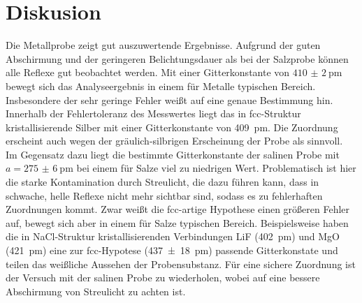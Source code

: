 \section{Diskusion}
Die Metallprobe zeigt gut auszuwertende Ergebnisse. Aufgrund der guten Abschirmung
und der geringeren Belichtungsdauer als bei der Salzprobe können alle Reflexe gut
beobachtet werden. Mit einer Gitterkonstante von $\SI{410(2)}{\pico\metre}$
bewegt sich das Analyseergebnis in einem für Metalle typischen Bereich.
Insbesondere der sehr geringe Fehler weißt auf eine genaue Bestimmung hin.
Innerhalb der Fehlertoleranz des Messwertes liegt das in fcc-Struktur kristallisierende
Silber mit einer Gitterkonstante von \SI{409}{\pico\metre}\cite{AM}. Die Zuordnung erscheint
auch wegen der gräulich-silbrigen Erscheinung der Probe als sinnvoll.\\
Im Gegensatz dazu liegt die bestimmte Gitterkonstante der salinen Probe mit
$a=\SI{275(6)}{\pico\metre}$ bei einem für Salze viel zu niedrigen Wert.
Problematisch ist hier
die starke Kontamination durch Streulicht, die dazu führen kann, dass in schwache,
helle Reflexe nicht mehr sichtbar sind, sodass es zu fehlerhaften Zuordnungen kommt.
Zwar weißt die fcc-artige Hypothese einen größeren Fehler auf, bewegt sich aber
in einem für Salze typischen Bereich. Beispielsweise haben die in NaCl-Struktur
kristallisierenden Verbindungen LiF (\SI{402}{\pico\metre}\cite{AM}) und
MgO (\SI{421}{\pico\metre}\cite{AM}) eine zur fcc-Hypotese (\SI{437(18)}{\pico\metre}) passende
Gitterkonstate und teilen das weißliche Aussehen der Probensubstanz.
Für eine sichere Zuordnung ist der Versuch mit der salinen Probe zu wiederholen,
wobei auf eine bessere Abschirmung von Streulicht zu achten ist.
